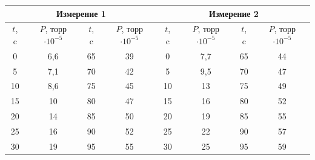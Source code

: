 \documentclass[a4paper, 12pt]{article}
\begin{document}
\begin{table}[H]
\begin{tabular}{|cccc|ccll|}
\hline
\multicolumn{4}{|c|}{Измерение 1}                                                                      & \multicolumn{4}{c|}{Измерение 2}                                                                        \\ \hline
\multicolumn{1}{|c|}{$t$, c}  & \multicolumn{1}{c|}{$P$, торр $\cdot 10^{-5}$}   & \multicolumn{1}{|c|}{$t$, c}   & $P$, торр $\cdot 10^{-5}$                     & \multicolumn{1}{c|}{$t$, c}  & \multicolumn{1}{c|}{$P$, торр $\cdot 10^{-5}$}   & \multicolumn{1}{c|}{$t$, c}   & \multicolumn{1}{c|}{$P$, торр $\cdot 10^{-5}$}   \\ \hline

\multicolumn{1}{|c|}{0}  & \multicolumn{1}{c|}{6,6} & \multicolumn{1}{c|}{65}  & 39                    & \multicolumn{1}{c|}{0}  & \multicolumn{1}{c|}{7,7} & \multicolumn{1}{c|}{65}  & \multicolumn{1}{c|}{44} \\ \hline
\multicolumn{1}{|c|}{5}  & \multicolumn{1}{c|}{7,1} & \multicolumn{1}{c|}{70}  & 42                    & \multicolumn{1}{c|}{5}  & \multicolumn{1}{c|}{9,5} & \multicolumn{1}{c|}{70}  & \multicolumn{1}{c|}{47} \\ \hline
\multicolumn{1}{|c|}{10} & \multicolumn{1}{c|}{8,6} & \multicolumn{1}{c|}{75}  & 45                    & \multicolumn{1}{c|}{10} & \multicolumn{1}{c|}{13}  & \multicolumn{1}{c|}{75}  & \multicolumn{1}{c|}{49} \\ \hline
\multicolumn{1}{|c|}{15} & \multicolumn{1}{c|}{10}  & \multicolumn{1}{c|}{80}  & 47                    & \multicolumn{1}{c|}{15} & \multicolumn{1}{c|}{16}  & \multicolumn{1}{c|}{80}  & \multicolumn{1}{c|}{52} \\ \hline
\multicolumn{1}{|c|}{20} & \multicolumn{1}{c|}{14}  & \multicolumn{1}{c|}{85}  & 50                    & \multicolumn{1}{c|}{20} & \multicolumn{1}{c|}{19}  & \multicolumn{1}{c|}{85}  & \multicolumn{1}{c|}{55} \\ \hline
\multicolumn{1}{|c|}{25} & \multicolumn{1}{c|}{16}  & \multicolumn{1}{c|}{90}  & 52                    & \multicolumn{1}{c|}{25} & \multicolumn{1}{c|}{22}  & \multicolumn{1}{c|}{90}  & \multicolumn{1}{c|}{57} \\ \hline
\multicolumn{1}{|c|}{30} & \multicolumn{1}{c|}{19}  & \multicolumn{1}{c|}{95}  & 55                    & \multicolumn{1}{c|}{30} & \multicolumn{1}{c|}{25}  & \multicolumn{1}{c|}{95}  & \multicolumn{1}{c|}{59} \\ \hline

\end{tabular}
\end{table}
\end{document}
